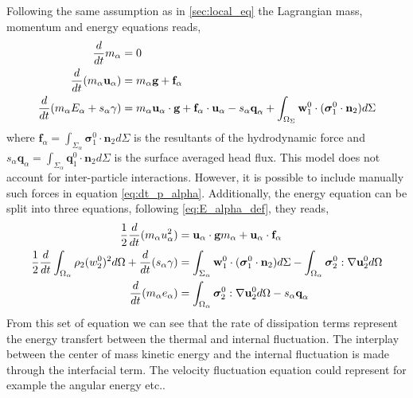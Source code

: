 Following the same assumption as in \ref{sec:local_eq} the Lagrangian  mass, momentum and energy equations reads, 
\begin{align}
    \label{eq:dt_m_alpha}
    \frac{d}{d t} m_\alpha
    &= 
    0\\
    \label{eq:dt_p_alpha}
    \frac{d}{d t} (m_\alpha \textbf{u}_\alpha)
    &= 
    m_\alpha\textbf{g}
    + \textbf{f}_\alpha\\
    \label{eq:dt_E_alpha}
    \frac{d}{d t} (m_\alpha E_\alpha + s_\alpha \gamma)
    &= 
    m_\alpha \textbf{u}_\alpha \cdot \textbf{g}
    +\textbf{f}_\alpha \cdot \textbf{u}_\alpha  
    - s_\alpha \textbf{q}_\alpha
    +\int_{\Omega_\Sigma} \textbf{w}_1^0 \cdot (\bm{\sigma}_1^0 \cdot  \textbf{n}_2) d\Sigma
\end{align}
where  $\textbf{f}_\alpha = \int_{\Sigma_\alpha}  \bm{\sigma}_1^0 \cdot \textbf{n}_2 d\Sigma$ is the resultants of the hydrodynamic force and $ s_\alpha \textbf{q}_\alpha = \int_{\Sigma_\alpha} \textbf{q}_1^0 \cdot \textbf{n}_2 d\Sigma$ is the surface averaged head flux. 
This model does not account for inter-particle interactions. 
However, it is possible to include manually such forces in equation \ref{eq:dt_p_alpha}.
Additionally, the energy equation can be split into three equations, following \ref{eq:E_alpha_def}, they reads, 
\begin{align}
    \label{eq:dt_u2_alpha}
    \frac{1}{2}\frac{d}{d t} (m_\alpha u_\alpha^2)
    &= 
    \textbf{u}_\alpha\cdot
    \textbf{g}m_\alpha
    + 
    \textbf{u}_\alpha\cdot
    \textbf{f}_\alpha\\
    \label{eq:dt_w2_alpha}
    \frac{1}{2}\frac{d}{d t} \int_{\Omega_\alpha} \rho_2 (w_2^0)^2 d\Omega 
    + \frac{d}{d t} (s_\alpha \gamma) 
    &= 
    \int_{\Sigma_\alpha} \textbf{w}_1^0 \cdot (\bm{\sigma}_1^0 \cdot \textbf{n}_2) d\Sigma  
     - \int_{\Omega_\alpha} \bm{\sigma}_2^0 : \mathbf{\nabla}\textbf{u}_2^0 d\Omega  
     \\
     \label{eq:dt_e_alpha}
    \frac{d}{d t} (m_\alpha e_\alpha )
    &= 
     \int_{\Omega_\alpha} \bm{\sigma}_2^0 : \mathbf{\nabla}\textbf{u}_2^0 d\Omega  
    -  s_\alpha \textbf{q}_\alpha  
\end{align}
From this set of equation we can see that the rate of dissipation terms represent the energy transfert between the thermal and internal fluctuation. 
The interplay between the center of mass  kinetic energy and the internal fluctuation is made through the interfacial term.
The velocity fluctuation equation could represent for example the angular energy etc..  

